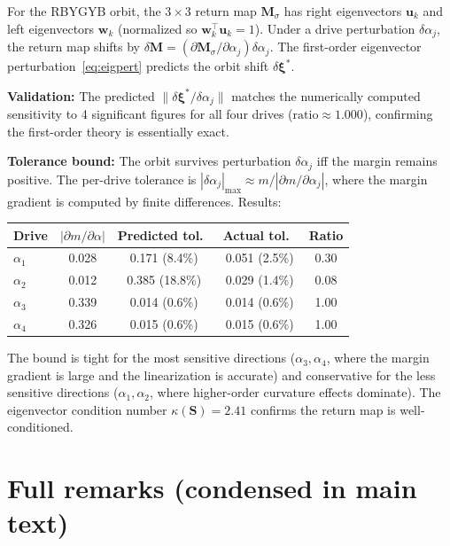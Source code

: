 \documentclass[12pt]{article}
\newcommand{\vv}[1]{\mathbf{#1}}
\newcommand{\xxi}{\boldsymbol{\xi}}
\begin{document}
For the RBYGYB orbit, the $3\times 3$ return map $\vv{M}_\sigma$ has right eigenvectors $\vv{u}_k$ and left eigenvectors $\vv{w}_k$ (normalized so $\vv{w}_k^\top\vv{u}_k=1$). Under a drive perturbation $\delta\alpha_j$, the return map shifts by $\delta\vv{M}=(\partial\vv{M}_\sigma/\partial\alpha_j)\delta\alpha_j$. The first-order eigenvector perturbation~\eqref{eq:eigpert} predicts the orbit shift $\delta\xxi^*$.

\textbf{Validation:} The predicted $\|\delta\xxi^*/\delta\alpha_j\|$ matches the numerically computed sensitivity to 4 significant figures for all four drives ($\text{ratio}\approx 1.000$), confirming the first-order theory is essentially exact.

\textbf{Tolerance bound:} The orbit survives perturbation $\delta\alpha_j$ iff the margin remains positive. The per-drive tolerance is $|\delta\alpha_j|_{\max}\approx m/|\partial m/\partial\alpha_j|$, where the margin gradient is computed by finite differences. Results:

\begin{center}
\begin{tabular}{lcccc}
\hline
Drive & $|\partial m/\partial\alpha|$ & Predicted tol.\ & Actual tol.\ & Ratio \\
\hline
$\alpha_1$ & 0.028 & 0.171 (8.4\%) & 0.051 (2.5\%) & 0.30 \\
$\alpha_2$ & 0.012 & 0.385 (18.8\%) & 0.029 (1.4\%) & 0.08 \\
$\alpha_3$ & 0.339 & 0.014 (0.6\%) & 0.014 (0.6\%) & 1.00 \\
$\alpha_4$ & 0.326 & 0.015 (0.6\%) & 0.015 (0.6\%) & 1.00 \\
\hline
\end{tabular}
\end{center}

The bound is tight for the most sensitive directions ($\alpha_3,\alpha_4$, where the margin gradient is large and the linearization is accurate) and conservative for the less sensitive directions ($\alpha_1,\alpha_2$, where higher-order curvature effects dominate). The eigenvector condition number $\kappa(\vv{S})=2.41$ confirms the return map is well-conditioned.




\section{Full remarks (condensed in main text)}\label{app:full-remarks}
\end{document}
